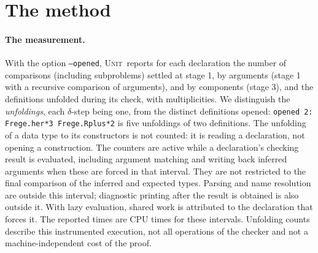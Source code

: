 \documentclass[11pt]{article}
\newcommand{\sys}{\textsc{Unit}}
\newcommand{\kw}[1]{\texttt{#1}}
\begin{document}
\section{The method}\label{sec:method}

\paragraph{The measurement.} With the option \kw{--opened}, \sys\ reports
for each declaration the number of comparisons (including subproblems)
settled at stage 1, by arguments (stage 1 with a recursive comparison of
arguments), and by components (stage 3), and the definitions unfolded
during its check, with multiplicities. We distinguish the
\emph{unfoldings}, each $\delta$-step being one, from the distinct
definitions opened: \kw{opened 2: Frege.her*3 Frege.Rplus*2} is five unfoldings of
two definitions. The unfolding of a data type to
its constructors is not counted: it is reading a declaration, not
opening a construction. The counters are active while a declaration's
checking result is evaluated, including argument matching and writing
back inferred arguments when these are forced in that interval. They
are not restricted to the final comparison of the inferred and expected
types. Parsing and name resolution are outside this interval; diagnostic
printing after the result is obtained is also outside it. With lazy
evaluation, shared work is attributed to the declaration that forces it.
The reported times are CPU times for these intervals. Unfolding counts
describe this instrumented execution, not all operations of the checker
and not a machine-independent cost of the proof.
\end{document}
